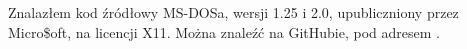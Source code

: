 Znalazłem kod źródłowy MS-DOSa, wersji 1.25 i 2.0, upubliczniony przez Micro\$oft, na licencji X11. Można znaleźć na GitHubie, pod adresem .
